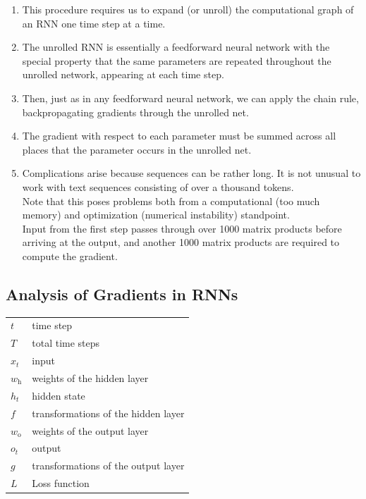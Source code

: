 \begin{enumerate}
    \item This procedure requires us to expand (or unroll) the computational graph of an RNN one time step at a time. 
    
    \item The unrolled RNN is essentially a feedforward neural network with the special property that the same parameters are repeated throughout the unrolled network, appearing at each time step. 
    
    \item Then, just as in any feedforward neural network, we can apply the chain rule, backpropagating gradients through the unrolled net. 
    
    \item The gradient with respect to each parameter must be summed across all places that the parameter occurs in the unrolled net.

    \item Complications arise because sequences can be rather long. It is not unusual to work with text sequences consisting of over a thousand tokens. \\
    Note that this poses problems both from a computational (too much memory) and optimization (numerical instability) standpoint. \\
    Input from the first step passes through over 1000 matrix products before arriving at the output, and another 1000 matrix products are required to compute the gradient.

\end{enumerate}

\subsection{Analysis of Gradients in RNNs \cite{dnn-1}}

\begin{customTableWrapper}{1.5}
\begin{longtable}{l p{8cm}}
    $t$ & time step \\
    $T$ & total time steps \\
    $x_t$ & input \\
    \hline
    $w_\textrm{h}$ & weights of the hidden layer \\
    $h_t$ & hidden state \\
    $f$ & transformations of the hidden layer \\
    \hline
    $w_\textrm{o}$ & weights of the output layer \\
    $o_t$ & output \\
    $g$ & transformations of the output layer \\
    \hline
    $L$ & Loss function \\
\end{longtable}
\end{customTableWrapper}

